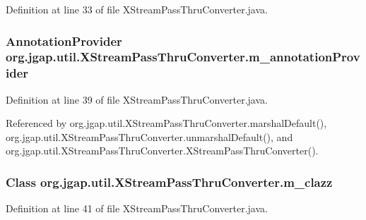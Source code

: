 Definition at line 33 of file X\-Stream\-Pass\-Thru\-Converter.\-java.

\hypertarget{classorg_1_1jgap_1_1util_1_1_x_stream_pass_thru_converter_a753ba49f233df92415b1fa62a2717a9d}{
\subsubsection[{m\-\_\-annotation\-Provider}]{\setlength{\rightskip}{0pt plus 5cm}Annotation\-Provider org.\-jgap.\-util.\-X\-Stream\-Pass\-Thru\-Converter.\-m\-\_\-annotation\-Provider\hspace{0.3cm}{\ttfamily [private]}}}\label{classorg_1_1jgap_1_1util_1_1_x_stream_pass_thru_converter_a753ba49f233df92415b1fa62a2717a9d}


Definition at line 39 of file X\-Stream\-Pass\-Thru\-Converter.\-java.



Referenced by org.\-jgap.\-util.\-X\-Stream\-Pass\-Thru\-Converter.\-marshal\-Default(), org.\-jgap.\-util.\-X\-Stream\-Pass\-Thru\-Converter.\-unmarshal\-Default(), and org.\-jgap.\-util.\-X\-Stream\-Pass\-Thru\-Converter.\-X\-Stream\-Pass\-Thru\-Converter().

\hypertarget{classorg_1_1jgap_1_1util_1_1_x_stream_pass_thru_converter_a835b79066b6d25abd4ab1cc49928065c}{
\subsubsection[{m\-\_\-clazz}]{\setlength{\rightskip}{0pt plus 5cm}Class org.\-jgap.\-util.\-X\-Stream\-Pass\-Thru\-Converter.\-m\-\_\-clazz\hspace{0.3cm}{\ttfamily [private]}}}\label{classorg_1_1jgap_1_1util_1_1_x_stream_pass_thru_converter_a835b79066b6d25abd4ab1cc49928065c}


Definition at line 41 of file X\-Stream\-Pass\-Thru\-Converter.\-java.



